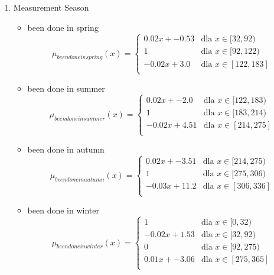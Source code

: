 \documentclass{classrep}
\begin{document}
{{            \begin{enumerate}
                \item Measurement Season
                \begin{itemize}
                    \item been done in spring
\begin{displaymath}
\mu_{been done in spring}(x) = \left\{ \begin{array}{ll}
0.02x + -0.53 & \textrm{dla $x \in [32, 92)$}\\
1 & \textrm{dla $x \in [92, 122)$}\\
-0.02x + 3.0 & \textrm{dla $x \in [122, 183]$}\\
\end{array} \right.
\end{displaymath}
                    \item been done in summer
\begin{displaymath}
\mu_{been done in summer}(x) = \left\{ \begin{array}{ll}
0.02x + -2.0 & \textrm{dla $x \in [122, 183)$}\\
1 & \textrm{dla $x \in [183, 214)$}\\
-0.02x + 4.51 & \textrm{dla $x \in [214, 275]$}\\
\end{array} \right.
\end{displaymath}
                    \item been done in autumn
\begin{displaymath}
\mu_{been done in autumn}(x) = \left\{ \begin{array}{ll}
0.02x + -3.51 & \textrm{dla $x \in [214, 275)$}\\
1 & \textrm{dla $x \in [275, 306)$}\\
-0.03x + 11.2 & \textrm{dla $x \in [306, 336]$}\\
\end{array} \right.
\end{displaymath}
                    \item been done in winter
\begin{displaymath}
\mu_{been done in winter}(x) = \left\{ \begin{array}{ll}
1 & \textrm{dla $x \in [0, 32)$}\\
-0.02x + 1.53 & \textrm{dla $x \in [32, 92)$}\\
0 & \textrm{dla $x \in [92, 275)$}\\
0.01x + -3.06 & \textrm{dla $x \in [275, 365]$}\\

\end{array}
\end{displaymath}
\end{itemize}
\end{enumerate}}}
\end{document}

